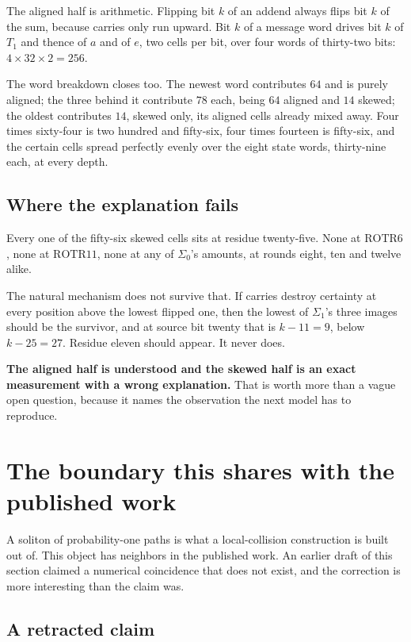 The aligned half is arithmetic. Flipping bit \(k\) of an addend always flips bit \(k\) of the sum,
because carries only run upward. Bit \(k\) of a message word drives bit \(k\) of \(T_1\) and
thence of \(a\) and of \(e\), two cells per bit, over four words of thirty-two bits:
\(4 \times 32 \times 2 = 256\).

The word breakdown closes too. The newest word contributes \(64\) and is purely aligned; the three
behind it contribute \(78\) each, being \(64\) aligned and \(14\) skewed; the oldest contributes
\(14\), skewed only, its aligned cells already mixed away. Four times sixty-four is two hundred and
fifty-six, four times fourteen is fifty-six, and the certain cells spread perfectly evenly over the
eight state words, thirty-nine each, at every depth.

\subsection{Where the explanation fails}

Every one of the fifty-six skewed cells sits at residue twenty-five. None at \(\mathrm{ROTR}6\),
none at \(\mathrm{ROTR}11\), none at any of \(\Sigma_0\)'s amounts, at rounds eight, ten and twelve
alike.

The natural mechanism does not survive that. If carries destroy certainty at every position above
the lowest flipped one, then the lowest of \(\Sigma_1\)'s three images should be the survivor, and
at source bit twenty that is \(k - 11 = 9\), below \(k - 25 = 27\). Residue eleven should appear.
It never does.

\textbf{The aligned half is understood and the skewed half is an exact measurement with a wrong
explanation.} That is worth more than a vague open question, because it names the observation the
next model has to reproduce.

\section{The boundary this shares with the published work}

A soliton of probability-one paths is what a local-collision construction is built out of. This
object has neighbors in the published work. An earlier draft of this section claimed a numerical
coincidence that does not exist, and the correction is more interesting than the claim was.

\subsection{A retracted claim}

